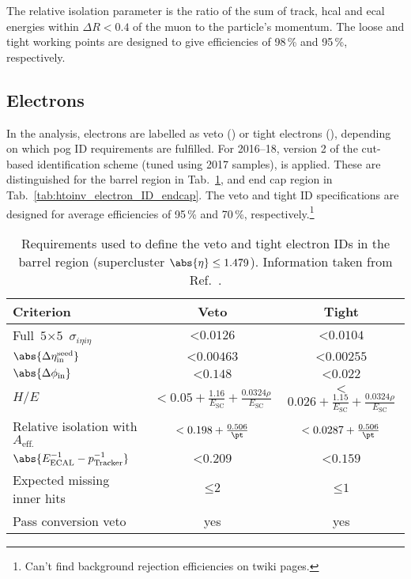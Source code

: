 The relative isolation parameter is the ratio of the sum of track, \acrshort{hcal} and \acrshort{ecal} energies within $\Delta R < \text{0.4}$ of the muon to the particle's momentum. The loose and tight working points are designed to give efficiencies of 98\,\% and 95\,\%, respectively.




\subsection{Electrons}
\label{subsec:objects_electrons}

In the analysis, electrons are labelled as veto (\vetoEle) or tight electrons (\tightEle), depending on which \acrshort{pog} ID requirements are fulfilled. For 2016--18, version 2 of the cut-based identification scheme (tuned using 2017 samples), is applied. These are distinguished for the barrel region in Tab.~\ref{tab:htoinv_electron_ID_barrel}, and end cap region in Tab.~\ref{tab:htoinv_electron_ID_endcap}. The veto and tight ID specifications are designed for average efficiencies of 95\,\% and 70\,\%, respectively.\footnote{Can't find background rejection efficiencies on twiki pages.}

\begin{table}[htbp]
    \centering
    \begin{tabular}{lcc}
    \hline
    Criterion & Veto & Tight \\\hline
    Full $\text{5} \times \text{5}$ $\sigma_{i\eta i\eta}$ & $< \text{0.0126}$ & $< \text{0.0104}$    \\
    $\abs{\Delta\eta_{\mathrm{in}}^{\mathrm{seed}}}$ & $< \text{0.00463}$ & $< \text{0.00255}$ \\
    $\abs{\Delta\phi_{\mathrm{in}}}$ & $< \text{0.148}$ & $< \text{0.022}$ \\
    $H/E$ & $<\text{0.05} + \frac{\text{1.16}}{E_{\mathrm{SC}}} + \frac{\text{0.0324}\rho}{E_{\mathrm{SC}}}$ & $<$ $\text{0.026} + \frac{\text{1.15}}{E_{\mathrm{SC}}} + \frac{\text{0.0324}\rho}{E_{\mathrm{SC}}}$ \\
    Relative isolation with $A_{\mathrm{eff.}}$ & $< \text{0.198} + \frac{\text{0.506}}{\pt}$ & $< \text{0.0287} + \frac{\text{0.506}}{\pt}$\\
    $\abs{E^{-1}_{\mathrm{ECAL}} - p^{-1}_{\mathrm{Tracker}}}$ & $< \text{0.209}$ & $< \text{0.159}$\\
    Expected missing inner hits & $\leq \text{2}$ & $\leq \text{1}$\\
    Pass conversion veto & yes & yes \\
    \hline
    \end{tabular}
    \caption[Requirements used to define the veto and tight electron IDs in the barrel region (supercluster $\abs{\eta} \leq \text{1.479}$)]{Requirements used to define the veto and tight electron IDs in the barrel region (supercluster $\abs{\eta} \leq \text{1.479}$). Information taken from Ref.~.}
    \label{tab:htoinv_electron_ID_barrel}
\end{table}

